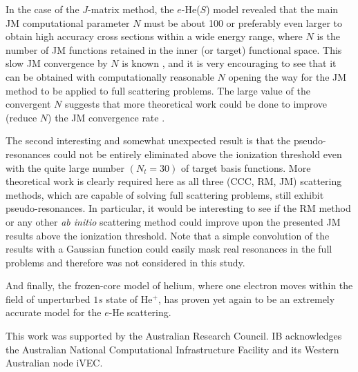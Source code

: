 \documentclass[aip
, pra
, showpacs
, aps
, twocolumn
, groupedaddress
, floatfix
]{revtex4}
\begin{document}
In the case of the $J$-matrix method, the $e$-He($S$) model revealed that the main JM computational parameter
$N$ must be about 100 or preferably even larger to obtain high accuracy cross sections within a wide energy range,
where $N$ is the number of JM functions retained in the inner (or target) functional space.
This slow JM convergence by $N$ is known \cite{HY74p1209},
and it is very encouraging to see that it can be obtained with computationally reasonable $N$
opening the way for the JM method to be applied to full scattering problems.
The large value of the convergent $N$ suggests that more theoretical work could be done to
improve (reduce $N$) the JM convergence rate \cite{VBA02p010404}.


The second interesting and somewhat unexpected result is that the pseudo-resonances could not be entirely eliminated
above the ionization threshold even with the quite large number $(N_t=30)$ of target basis functions.
More theoretical work is clearly required here as all three (CCC, RM, JM) scattering methods,
which are capable of solving full scattering problems, still exhibit pseudo-resonances.
In particular, it would be interesting to see if the RM method or any other {\em ab initio} scattering method could improve upon the
presented JM results above the ionization threshold.
Note that a simple convolution of the results with a Gaussian function could easily mask real resonances in the full problems
and therefore was not considered in this study.


And finally, the frozen-core model of helium, where one electron moves within the field of unperturbed $1s$ state of He$^+$,
has proven yet again to be an extremely accurate model for the $e$-He scattering.


\begin{acknowledgments}
This work was supported by the Australian Research Council. IB
acknowledges the Australian National Computational Infrastructure
Facility and its Western Australian node iVEC.
\end{acknowledgments}





\end{document}
